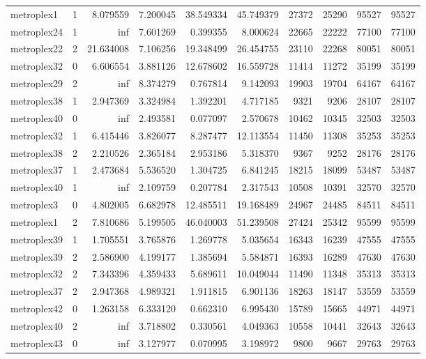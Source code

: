 \begin{longtable}{|l|r|r|r|r|r|r|r|r|r|}
metroplex1 & 1 & 8.079559 & 7.200045 & 38.549334 & 45.749379 & 27372 & 25290 & 95527 & 95527 \\
metroplex24 & 1 & inf & 7.601269 & 0.399355 & 8.000624 & 22665 & 22222 & 77100 & 77100 \\
metroplex22 & 2 & 21.634008 & 7.106256 & 19.348499 & 26.454755 & 23110 & 22268 & 80051 & 80051 \\
metroplex32 & 0 & 6.606554 & 3.881126 & 12.678602 & 16.559728 & 11414 & 11272 & 35199 & 35199 \\
metroplex29 & 2 & inf & 8.374279 & 0.767814 & 9.142093 & 19903 & 19704 & 64167 & 64167 \\
metroplex38 & 1 & 2.947369 & 3.324984 & 1.392201 & 4.717185 & 9321 & 9206 & 28107 & 28107 \\
metroplex40 & 0 & inf & 2.493581 & 0.077097 & 2.570678 & 10462 & 10345 & 32503 & 32503 \\
metroplex32 & 1 & 6.415446 & 3.826077 & 8.287477 & 12.113554 & 11450 & 11308 & 35253 & 35253 \\
metroplex38 & 2 & 2.210526 & 2.365184 & 2.953186 & 5.318370 & 9367 & 9252 & 28176 & 28176 \\
metroplex37 & 1 & 2.473684 & 5.536520 & 1.304725 & 6.841245 & 18215 & 18099 & 53487 & 53487 \\
metroplex40 & 1 & inf & 2.109759 & 0.207784 & 2.317543 & 10508 & 10391 & 32570 & 32570 \\
metroplex3 & 0 & 4.802005 & 6.682978 & 12.485511 & 19.168489 & 24967 & 24485 & 84511 & 84511 \\
metroplex1 & 2 & 7.810686 & 5.199505 & 46.040003 & 51.239508 & 27424 & 25342 & 95599 & 95599 \\
metroplex39 & 1 & 1.705551 & 3.765876 & 1.269778 & 5.035654 & 16343 & 16239 & 47555 & 47555 \\
metroplex39 & 2 & 2.586900 & 4.199177 & 1.385694 & 5.584871 & 16393 & 16289 & 47630 & 47630 \\
metroplex32 & 2 & 7.343396 & 4.359433 & 5.689611 & 10.049044 & 11490 & 11348 & 35313 & 35313 \\
metroplex37 & 2 & 2.947368 & 4.989321 & 1.911815 & 6.901136 & 18263 & 18147 & 53559 & 53559 \\
metroplex42 & 0 & 1.263158 & 6.333120 & 0.662310 & 6.995430 & 15789 & 15665 & 44971 & 44971 \\
metroplex40 & 2 & inf & 3.718802 & 0.330561 & 4.049363 & 10558 & 10441 & 32643 & 32643 \\
metroplex43 & 0 & inf & 3.127977 & 0.070995 & 3.198972 & 9800 & 9667 & 29763 & 29763 \\

\end{longtable}
